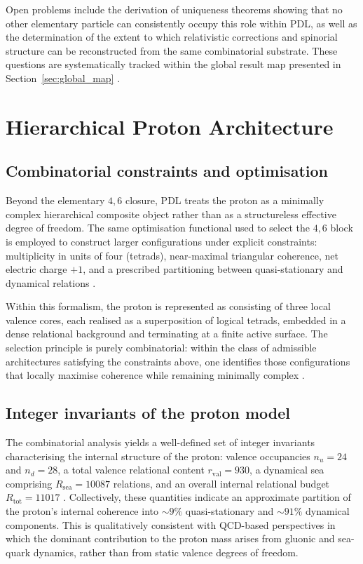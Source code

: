 \documentclass[11pt,a4paper]{article}
\begin{document}
Open problems include the derivation of uniqueness theorems showing that no other elementary particle can consistently occupy this role within PDL, as well as the determination of the extent to which relativistic corrections and spinorial structure can be reconstructed from the same combinatorial substrate. These questions are systematically tracked within the global result map presented in Section~\ref{sec:global_map} \citep{PDL_position}.

\section{Hierarchical Proton Architecture}
\label{sec:proton_architecture}

\subsection{Combinatorial constraints and optimisation}
\label{subsec:proton_constraints}

Beyond the elementary \(4,6\) closure, PDL treats the proton as a minimally complex hierarchical composite object rather than as a structureless effective degree of freedom. The same optimisation functional used to select the \(4,6\) block is employed to construct larger configurations under explicit constraints: multiplicity in units of four (tetrads), near-maximal triangular coherence, net electric charge \(+1\), and a prescribed partitioning between quasi-stationary and dynamical relations \citep{PDL_Main_2026,Combinatorial_Proton_v2_2026}.

Within this formalism, the proton is represented as consisting of three local valence cores, each realised as a superposition of logical tetrads, embedded in a dense relational background and terminating at a finite active surface. The selection principle is purely combinatorial: within the class of admissible architectures satisfying the constraints above, one identifies those configurations that locally maximise coherence while remaining minimally complex \citep{Combinatorial_Proton_v2_2026,PDL_intro}.

\subsection{Integer invariants of the proton model}
\label{subsec:proton_integers}

The combinatorial analysis yields a well-defined set of integer invariants characterising the internal structure of the proton: valence occupancies \(n_u = 24\) and \(n_d = 28\), a total valence relational content \(r_{\mathrm{val}} = 930\), a dynamical sea comprising \(R_{\mathrm{sea}} = 10087\) relations, and an overall internal relational budget \(R_{\mathrm{tot}} = 11017\) \citep{Combinatorial_Proton_v2_2026,PDL_intro}. Collectively, these quantities indicate an approximate partition of the proton’s internal coherence into \(\sim 9\%\) quasi-stationary and \(\sim 91\%\) dynamical components. This is qualitatively consistent with QCD-based perspectives in which the dominant contribution to the proton mass arises from gluonic and sea-quark dynamics, rather than from static valence degrees of freedom.
\end{document}
